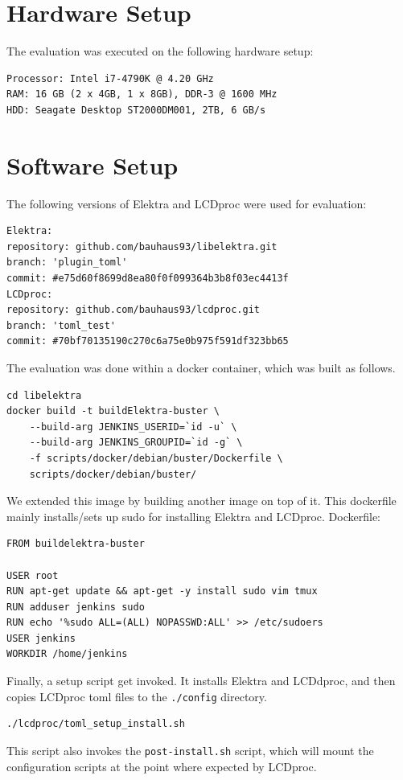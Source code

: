 \documentclass[12pt]{report}
\begin{document}
\section{Hardware Setup}
The evaluation was executed on the following hardware setup:
\begin{verbatim}
Processor: Intel i7-4790K @ 4.20 GHz
RAM: 16 GB (2 x 4GB, 1 x 8GB), DDR-3 @ 1600 MHz 
HDD: Seagate Desktop ST2000DM001, 2TB, 6 GB/s
\end{verbatim}

\section{Software Setup}

The following versions of Elektra and LCDproc were used for evaluation:
\begin{tcolorbox}
\begin{verbatim}
Elektra:
repository: github.com/bauhaus93/libelektra.git
branch: 'plugin_toml'
commit: #e75d60f8699d8ea80f0f099364b3b8f03ec4413f
LCDproc:
repository: github.com/bauhaus93/lcdproc.git
branch: 'toml_test'
commit: #70bf70135190c270c6a75e0b975f591df323bb65
\end{verbatim}
\end{tcolorbox}


The evaluation was done within a docker container, which was built as follows.
\begin{tcolorbox}
\begin{verbatim}
cd libelektra
docker build -t buildElektra-buster \
    --build-arg JENKINS_USERID=`id -u` \
    --build-arg JENKINS_GROUPID=`id -g` \
    -f scripts/docker/debian/buster/Dockerfile \
    scripts/docker/debian/buster/
\end{verbatim}
\end{tcolorbox}

We extended this image by building another image on top of it. This dockerfile mainly installs/sets up sudo for installing Elektra and LCDproc.
Dockerfile:
\begin{tcolorbox}
\small
\begin{verbatim}
FROM buildelektra-buster

USER root
RUN apt-get update && apt-get -y install sudo vim tmux
RUN adduser jenkins sudo
RUN echo '%sudo ALL=(ALL) NOPASSWD:ALL' >> /etc/sudoers
USER jenkins
WORKDIR /home/jenkins
\end{verbatim}
\end{tcolorbox}

Finally, a setup script get invoked. It installs Elektra and LCDdproc, and then copies LCDproc \acrshort{toml} files to the \texttt{./config} directory.
\begin{tcolorbox}
\small
\begin{verbatim}
./lcdproc/toml_setup_install.sh
\end{verbatim}
\end{tcolorbox}
This script also invokes the \texttt{post-install.sh} script, which will mount the configuration scripts at the point where expected by LCDproc.
\end{document}
